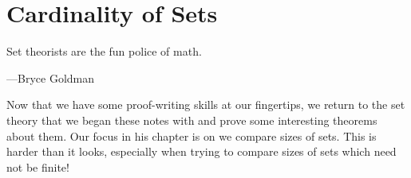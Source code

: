 \documentclass[../notes.tex]{subfiles}
\begin{document}
\chapter{Cardinality of Sets}
\epigraph{Set theorists are the fun police of math.}
{---Bryce Goldman}
Now that we have some proof-writing skills at our fingertips, we return to the set theory that we began these notes with and prove some interesting theorems about them. Our focus in his chapter is on we compare sizes of sets. This is harder than it looks, especially when trying to compare sizes of sets which need not be finite!



\end{document}
